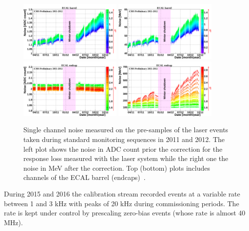 \begin{figure}[h!]
  \centering
  \includegraphics[width = 0.45\textwidth]{figures/ecal/EB_noise_ADC_counts_2011_2012.png}
  \includegraphics[width = 0.45\textwidth]{figures/ecal/EB_noise_MeV_2011_2012.png} \\
  \includegraphics[width = 0.45\textwidth]{figures/ecal/EE_noise_ADC_counts_2011_2012.png}
  \includegraphics[width = 0.45\textwidth]{figures/ecal/EE_noise_MeV_2011_2012.png}
  \caption{Single channel noise measured on the pre-samples of the laser events taken during
    standard monitoring sequences in 2011 and 2012. The left plot shows the noise in ADC count prior the
    correction for the response loss measured with the laser system while the right one the noise in MeV
    after the correction. Top (bottom) plots includes channels of the ECAL barrel (endcaps)~\cite{ecal_2012}.}
  \label{fig:ecal_noise}
\end{figure}

During 2015 and 2016 the calibration stream recorded events at a variable rate between 1 and 3 kHz with peaks of 20 kHz during
commissioning periods. The rate is kept under control by prescaling zero-bias events (whose rate is almost 40 MHz).

